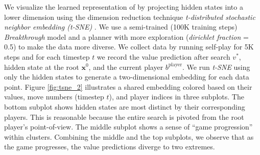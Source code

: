 We visualize the learned representation of \moozi by projecting hidden states into a lower dimension using the dimension reduction technique \textit{t-distributed stochastic neighbor embedding (t-SNE)} \cite{VisualizingDataUsing_Maaten.Hinton_2008}.
We use a semi-trained (100K training steps) \textit{Breakthrough} model and a planner with more exploration (\textit{dirichlet fraction} = 0.5) to make the data more diverse.
We collect data by running self-play for 5K steps and for each timestep $t$ we record the value prediction after search $v^{*}$, hidden state at the root $\mathbf{x}^0$, and the current player $b^{\text{player}}$.
We run \textit{t-SNE} using only the hidden states to generate a two-dimensional embedding for each data point.
Figure \ref{fig:tsne_2} illustrates a shared embedding colored based on their values, move numbers (timestep $t$), and player indices in three subplots.
The bottom subplot shows hidden states are most distinct by their corresponding players.
This is reasonable because the entire search is pivoted from the root player's point-of-view.
The middle subplot shows a sense of ``game progression'' within clusters.
Combining the middle and the top subplots, we observe that as the game progresses, the value predictions diverge to two extremes.
